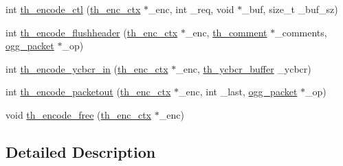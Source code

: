 \begin{DoxyCompactItemize}
\item 
int \hyperlink{group__encfuncs_ga3a427f6514dfdc01ea72172c469d51d9}{th\+\_\+encode\+\_\+ctl} (\hyperlink{structth__enc__ctx}{th\+\_\+enc\+\_\+ctx} $\ast$\+\_\+enc, int \+\_\+req, void $\ast$\+\_\+buf, size\+\_\+t \+\_\+buf\+\_\+sz)
\item 
int \hyperlink{group__encfuncs_ga9439d61b566039d194ff782681fbc408}{th\+\_\+encode\+\_\+flushheader} (\hyperlink{structth__enc__ctx}{th\+\_\+enc\+\_\+ctx} $\ast$\+\_\+enc, \hyperlink{structth__comment}{th\+\_\+comment} $\ast$\+\_\+comments, \hyperlink{structogg__packet}{ogg\+\_\+packet} $\ast$\+\_\+op)
\item 
int \hyperlink{group__encfuncs_gadbe7dd66b411c2d61ab8153c15308750}{th\+\_\+encode\+\_\+ycbcr\+\_\+in} (\hyperlink{structth__enc__ctx}{th\+\_\+enc\+\_\+ctx} $\ast$\+\_\+enc, \hyperlink{theora_2libtheora-1_81_81_2include_2theora_2codec_8h_a343f7cfabad179cc4fe527cf06873f45}{th\+\_\+ycbcr\+\_\+buffer} \+\_\+ycbcr)
\item 
int \hyperlink{group__encfuncs_ga96d8ac1dda53187455352f99bbb5b04b}{th\+\_\+encode\+\_\+packetout} (\hyperlink{structth__enc__ctx}{th\+\_\+enc\+\_\+ctx} $\ast$\+\_\+enc, int \+\_\+last, \hyperlink{structogg__packet}{ogg\+\_\+packet} $\ast$\+\_\+op)
\item 
void \hyperlink{group__encfuncs_ga36b23d216532231925c4107894204680}{th\+\_\+encode\+\_\+free} (\hyperlink{structth__enc__ctx}{th\+\_\+enc\+\_\+ctx} $\ast$\+\_\+enc)
\end{DoxyCompactItemize}


\subsection{Detailed Description}


